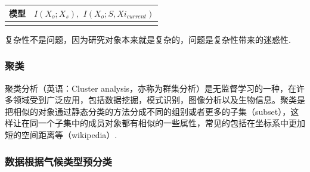 \documentclass{beamer}
\begin{document}
\begin{CJK}{UTF8}{gkai}
\begin{frame}
\begin{table}[H]
\begin{tabular}{cc}
\\
模型  & $I(X_o;X_s),$ $I(X_o;S,Xi_{current})$  \\
\bottomrule[1.5 pt]\\
\end{tabular}
\end{table}
复杂性不是问题，因为研究对象本来就是复杂的，问题是复杂性带来的迷惑性.
\end{frame}

\begin{frame}
\frametitle{聚类}
聚类分析（英语：Cluster analysis，亦称为群集分析）是无监督学习的一种，在许多领域受到广泛应用，包括数据挖掘，模式识别，图像分析以及生物信息。聚类是把相似的对象通过静态分类的方法分成不同的组别或者更多的子集（subset），这样让在同一个子集中的成员对象都有相似的一些属性，常见的包括在坐标系中更加短的空间距离等（wikipedia）.
\end{frame}

\begin{frame}
\frametitle{数据根据气候类型预分类}
\begin{table}[H]\scriptsize
\centering
\caption{流域基本状况} 
\end{table}
\end{frame}
\end{CJK}
\end{document}

